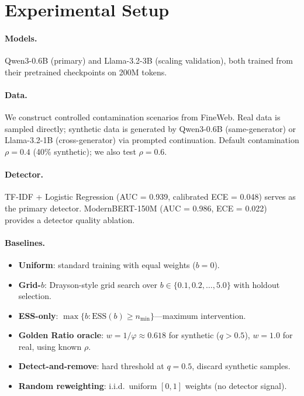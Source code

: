 \documentclass[11pt,a4paper]{article}
\newcommand{\nmin}{n_{\min}}
\begin{document}
\section{Experimental Setup}
\label{sec:setup}

\paragraph{Models.}
Qwen3-0.6B (primary) and Llama-3.2-3B (scaling validation), both trained from their pretrained checkpoints on 200M tokens.

\paragraph{Data.}
We construct controlled contamination scenarios from FineWeb.
Real data is sampled directly; synthetic data is generated by Qwen3-0.6B (same-generator) or Llama-3.2-1B (cross-generator) via prompted continuation.
Default contamination $\rho = 0.4$ (40\% synthetic); we also test $\rho = 0.6$.

\paragraph{Detector.}
TF-IDF + Logistic Regression (AUC = 0.939, calibrated ECE = 0.048) serves as the primary detector.
ModernBERT-150M (AUC = 0.986, ECE = 0.022) provides a detector quality ablation.

\paragraph{Baselines.}
\begin{itemize}
    \item \textbf{Uniform}: standard training with equal weights ($b=0$).
    \item \textbf{Grid-$b$}: Drayson-style grid search over $b \in \{0.1, 0.2, \ldots, 5.0\}$ with holdout selection.
    \item \textbf{ESS-only}: $\max\{b : \mathrm{ESS}(b) \geq \nmin\}$---maximum intervention.
    \item \textbf{Golden Ratio oracle}: $w = 1/\varphi \approx 0.618$ for synthetic ($q > 0.5$), $w = 1.0$ for real, using known $\rho$.
    \item \textbf{Detect-and-remove}: hard threshold at $q = 0.5$, discard synthetic samples.
    \item \textbf{Random reweighting}: i.i.d.\ uniform $[0,1]$ weights (no detector signal).
\end{itemize}
\end{document}

